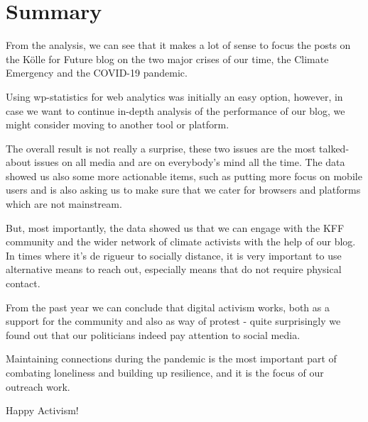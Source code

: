 %
%

\pagebreak
\section{Summary}

\onehalfspacing

From the analysis, we can see that it makes a lot of sense to focus the posts on the Kölle for Future blog on the two major crises of our time, the Climate Emergency and the COVID-19 pandemic.

Using wp-statistics for web analytics was initially an easy option, however, in case we want to continue in-depth analysis of the performance of our blog, we might consider moving to another tool or platform.

The overall result is not really a surprise, these two issues are the most talked-about issues on all media and are on everybody's mind all the time. The data showed us also some more actionable items, such as putting more focus on mobile users and is also asking us to make sure that we cater for browsers and platforms which are not mainstream.

But, most importantly, the data showed us that we can engage with the KFF community and the wider network of climate activists with the help of our blog. In times where it's de rigueur to socially distance, it is very important to use alternative means to reach out, especially means that do not require physical contact. 

From the past year we can conclude that digital activism works, both as a support for the community and also as way of protest - quite surprisingly we found out that our politicians indeed pay attention to social media.

Maintaining connections during the pandemic is the most important part of combating loneliness and building up resilience, and it is the focus of our outreach work.

Happy Activism!

